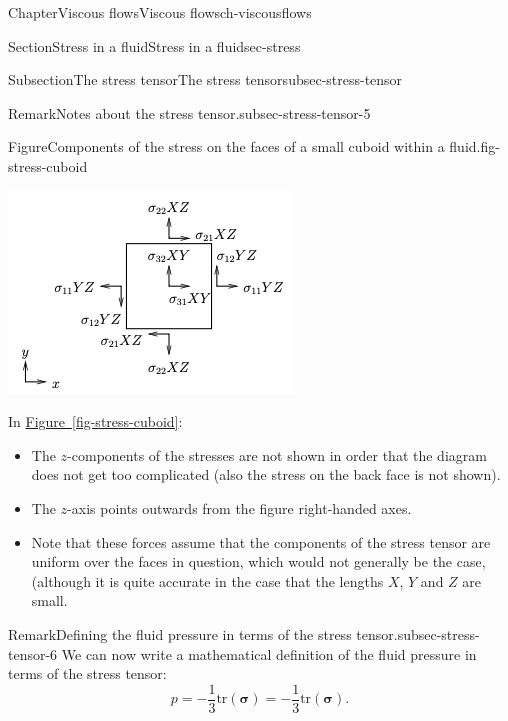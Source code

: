 \documentclass[oneside,10pt,]{book}
\newcommand{\xreffont}{\relax}
\numberwithin{equation}{section}
\newcommand{\bsigma}{\boldsymbol{\sigma}}
\begin{document}
\begin{chapterptx}{Chapter}{Viscous flows}{}{Viscous flows}{}{}{ch-viscousflows}
\begin{sectionptx}{Section}{Stress in a fluid}{}{Stress in a fluid}{}{}{sec-stress}
\begin{subsectionptx}{Subsection}{The stress tensor}{}{The stress tensor}{}{}{subsec-stress-tensor}
\begin{remark}{Remark}{Notes about the stress tensor.}{subsec-stress-tensor-5}
\begin{itemize}[label=\textbullet]
\begin{figureptx}{Figure}{Components of the stress on the faces of a small cuboid within a fluid.}{fig-stress-cuboid}{}
\begin{image}{0.2}{0.6}{0.2}{}
\includegraphics[width=\linewidth]{external/ch-chapter07-stress-on-square.jpg}
\end{image}%
\tcblower
\end{figureptx}%
In \hyperref[fig-stress-cuboid]{Figure~{\xreffont\ref{fig-stress-cuboid}}}:%
\begin{itemize}[label=$\circ$]
\item{}The \(z\)-components of the stresses are not shown in order that the diagram does not get too complicated (also the stress on the back face is not shown).%
\item{}The \(z\)-axis points outwards from the figure \textendash{} right-handed axes.%
\item{}Note that these forces assume that the components of the stress tensor are uniform over the faces in question, which would not generally be the case, (although it is quite accurate in the case that the lengths \(X\), \(Y\) and \(Z\) are small.%
\end{itemize}
%
\end{itemize}
%
\end{remark}
\begin{remark}{Remark}{Defining the fluid pressure in terms of the stress tensor.}{subsec-stress-tensor-6}%
We can now write a mathematical definition of the fluid pressure in terms of the stress tensor:%
\begin{equation}
p=-\frac13\textrm{tr}\left(\bsigma\right)=-\frac13\textrm{tr}\left(\bsigma\right).\label{eq-defofp}
\end{equation}

\end{remark}
\end{subsectionptx}
\end{sectionptx}
\end{chapterptx}
\end{document}
